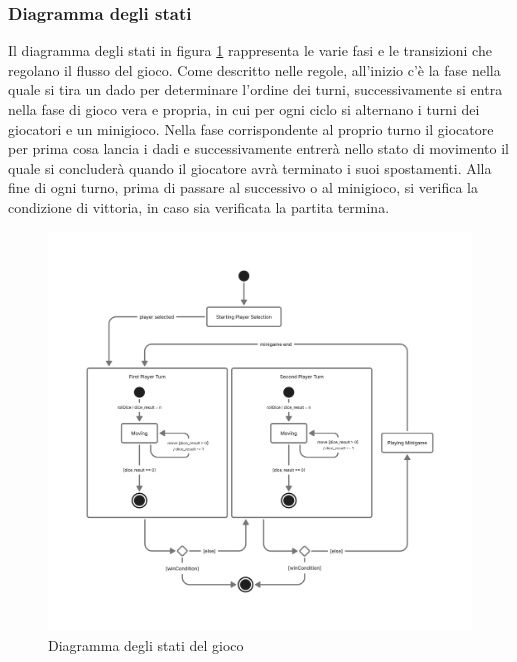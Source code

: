 \subsubsection{Diagramma degli stati} \label{sec:design-choices:state-diagram}
Il diagramma degli stati in figura \ref{fig:game-state-diagram} rappresenta le varie fasi e le transizioni che regolano il flusso del gioco.
Come descritto nelle regole, all'inizio c'è la fase nella quale si tira un dado per determinare l'ordine dei turni, successivamente si entra
nella fase di gioco vera e propria, in cui per ogni ciclo si alternano i turni dei giocatori e un minigioco. Nella fase corrispondente al proprio
turno il giocatore per prima cosa lancia i dadi e successivamente entrerà nello stato di movimento il quale si concluderà quando il giocatore
avrà terminato i suoi spostamenti. Alla fine di ogni turno, prima di passare al successivo o al minigioco, si verifica la condizione di vittoria,
in caso sia verificata la partita termina.
\begin{figure}[ht!]
    \centering
    \includegraphics[width=\textwidth]{figures/game-state-diagram.png}
    \caption{Diagramma degli stati del gioco}
    \label{fig:game-state-diagram}
\end{figure}

